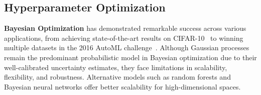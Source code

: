 
\subsection{Hyperparameter Optimization}
\textbf{Bayesian Optimization} has demonstrated remarkable success across various applications, from achieving state-of-the-art results on CIFAR-10~\citep{snoek2012practical} to winning multiple datasets in the 2016 AutoML challenge~\citep{mendoza2016towards}. Although Gaussian processes remain the predominant probabilistic model in Bayesian optimization due to their well-calibrated uncertainty estimates, they face limitations in scalability, flexibility, and robustness. Alternative models such as random forests \citep{hutter2011sequential} and Bayesian neural networks \citep{snoek2015scalable, springenberg2016bayesian, perrone2017multiple} offer better scalability for high-dimensional spaces.

